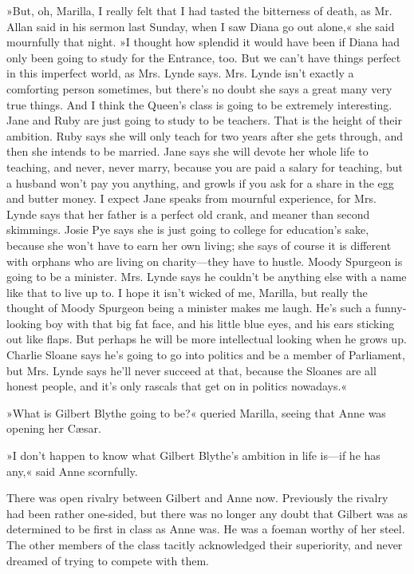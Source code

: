»But, oh, Marilla, I really felt that I had tasted the bitterness of death, as Mr. Allan said in his sermon last Sunday, when I saw Diana go out alone,« she said mournfully that night. »I thought how splendid it would have been if Diana had only been going to study for the Entrance, too. But we can't have things perfect in this imperfect world, as Mrs. Lynde says. Mrs. Lynde isn't exactly a comforting person sometimes, but there's no doubt she says a great many very true things. And I think the Queen's class is going to be extremely interesting. Jane and Ruby are just going to study to be teachers. That is the height of their ambition. Ruby says she will only teach for two years after she gets through, and then she intends to be married. Jane says she will devote her whole life to teaching, and never, never marry, because you are paid a salary for teaching, but a husband won't pay you anything, and growls if you ask for a share in the egg and butter money. I expect Jane speaks from mournful experience, for Mrs. Lynde says that her father is a perfect old crank, and meaner than second skimmings. Josie Pye says she is just going to college for education's sake, because she won't have to earn her own living; she says of course it is different with orphans who are living on charity—they have to hustle. Moody Spurgeon is going to be a minister. Mrs. Lynde says he couldn't be anything else with a name like that to live up to. I hope it isn't wicked of me, Marilla, but really the thought of Moody Spurgeon being a minister makes me laugh. He's such a funny-looking boy with that big fat face, and his little blue eyes, and his ears sticking out like flaps. But perhaps he will be more intellectual looking when he grows up. Charlie Sloane says he's going to go into politics and be a member of Parliament, but Mrs. Lynde says he'll never succeed at that, because the Sloanes are all honest people, and it's only rascals that get on in politics nowadays.«

»What is Gilbert Blythe going to be?« queried Marilla, seeing that Anne was opening her Cæsar.

»I don't happen to know what Gilbert Blythe's ambition in life is—if he has any,« said Anne scornfully.

There was open rivalry between Gilbert and Anne now. Previously the rivalry had been rather one-sided, but there was no longer any doubt that Gilbert was as determined to be first in class as Anne was. He was a foeman worthy of her steel. The other members of the class tacitly acknowledged their superiority, and never dreamed of trying to compete with them.

